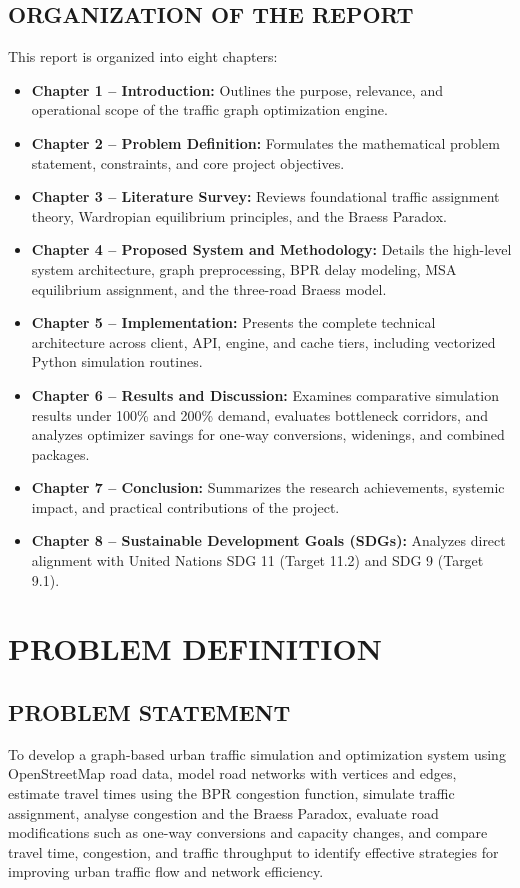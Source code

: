 \documentclass[12pt,a4paper]{report}
\begin{document}
\section{ORGANIZATION OF THE REPORT}
This report is organized into eight chapters:
\begin{itemize}
  \item \textbf{Chapter 1 -- Introduction:} Outlines the purpose, relevance, and operational scope of the traffic graph optimization engine.
  \item \textbf{Chapter 2 -- Problem Definition:} Formulates the mathematical problem statement, constraints, and core project objectives.
  \item \textbf{Chapter 3 -- Literature Survey:} Reviews foundational traffic assignment theory, Wardropian equilibrium principles, and the Braess Paradox.
  \item \textbf{Chapter 4 -- Proposed System and Methodology:} Details the high-level system architecture, graph preprocessing, BPR delay modeling, MSA equilibrium assignment, and the three-road Braess model.
  \item \textbf{Chapter 5 -- Implementation:} Presents the complete technical architecture across client, API, engine, and cache tiers, including vectorized Python simulation routines.
  \item \textbf{Chapter 6 -- Results and Discussion:} Examines comparative simulation results under 100\% and 200\% demand, evaluates bottleneck corridors, and analyzes optimizer savings for one-way conversions, widenings, and combined packages.
  \item \textbf{Chapter 7 -- Conclusion:} Summarizes the research achievements, systemic impact, and practical contributions of the project.
  \item \textbf{Chapter 8 -- Sustainable Development Goals (SDGs):} Analyzes direct alignment with United Nations SDG 11 (Target 11.2) and SDG 9 (Target 9.1).
\end{itemize}

\chapter{PROBLEM DEFINITION}
\label{chap:problem}

\section{PROBLEM STATEMENT}
To develop a graph-based urban traffic simulation and optimization system using OpenStreetMap road data, model road networks with vertices and edges, estimate travel times using the BPR congestion function, simulate traffic assignment, analyse congestion and the Braess Paradox, evaluate road modifications such as one-way conversions and capacity changes, and compare travel time, congestion, and traffic throughput to identify effective strategies for improving urban traffic flow and network efficiency.
\end{document}
